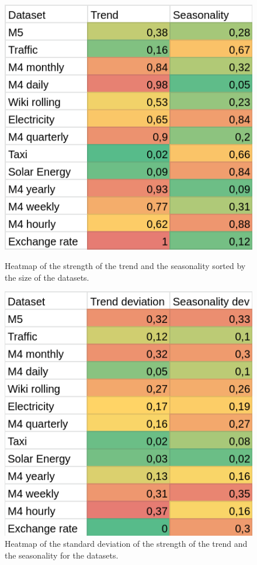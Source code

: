 \begin{figure}[htb]
  \centering
  \includegraphics[width=\linewidth]{./img//dataset_trend_seasonality_heatmap_mean.png}
  \caption{Heatmap of the strength of the trend and the seasonality sorted by the size of the datasets.}
  \endminipage\hfill
  \includegraphics[width=\linewidth]{./img//dataset_trend_seasonality_heatmap_deviation.png}
  \caption{Heatmap of the standard deviation of the strength of the trend and the seasonality for the datasets.}
  \endminipage\hfill
\end{figure}
\label{heatmap_strengths}

